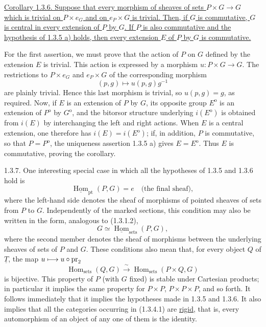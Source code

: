 
\underline{Corollary 1.3.6. Suppose that every morphism of sheaves of
sets $P\times G\longrightarrow G$ which is trivial on $P\times e_G$
and on $e_P\times G$ is trivial. Then, if $G$ is commutative, $G$ is
central in every extension of $P$ by $G$. If $P$ is also commutative
and the hypothesis of 1.3.5 a) holds, then every extension $E$ of $P$
by $G$ is commutative.}

For the first assertion, we must prove that the action of $P$ on $G$
defined by the extension $E$ is trivial. This action is expressed by a
morphism $u:P\times G\longrightarrow G$. The restrictions to
$P\times e_G$ and $e_P\times G$ of the corresponding morphism
\[
 (p,g)\longmapsto u(p,g)g^{-1}
\]
are plainly trivial. Hence this last morphism is trivial, so
$u(p,g)=g$, as required. Now, if $E$ is an extension of $P$ by $G$, its
opposite group $E^{\mathrm o}$ is an extension of $P^{\mathrm o}$ by
$G^{\mathrm o}$, and the bitorsor structure underlying
$i(E^{\mathrm o})$ is obtained from $i(E)$ by interchanging the left
and right actions. When $E$ is a central extension, one therefore has
$i(E)=i(E^{\mathrm o})$; if, in addition, $P$ is commutative, so that
$P=P^{\mathrm o}$, the uniqueness assertion 1.3.5 a) gives
$E=E^{\mathrm o}$. Thus $E$ is commutative, proving the corollary.


1.3.7. One interesting special case in which all the hypotheses of
1.3.5 and 1.3.6 hold is
\begin{equation}\tag{1.3.7.1}
 \underline{\operatorname{Hom}}_{\mathrm{pt}}(P,G)=e
 \quad\text{(the final sheaf)},
\end{equation}
where the left-hand side denotes the sheaf of morphisms of pointed
sheaves of sets from $P$ to $G$. Independently of the marked sections,
this condition may also be written in the form, analogous to (1.3.1.2),
\begin{equation}\tag{1.3.7.2}
 G\simeq\underline{\operatorname{Hom}}_{\mathrm{sets}}(P,G),
\end{equation}
where the second member denotes the sheaf of morphisms between the
underlying sheaves of sets of $P$ and $G$. These conditions also mean
that, for every object $Q$ of $\underline T$, the map
$u\longmapsto u\circ\operatorname{pr}_2$
\begin{equation}\tag{1.3.7.3}
 \operatorname{Hom}_{\mathrm{sets}}(Q,G)
 \xrightarrow{\ \sim\ }
 \operatorname{Hom}_{\mathrm{sets}}(P\times Q,G)
\end{equation}
is bijective. This property of $P$ (with $G$ fixed) is stable under
Cartesian products; in particular it implies the same property for
$P\times P$, $P\times P\times P$, and so forth. It follows immediately
that it implies the hypotheses made in 1.3.5 and 1.3.6. It also implies
that all the categories occurring in (1.3.4.1) are \underline{rigid},
that is, every automorphism of an object of any one of them is the
identity.


